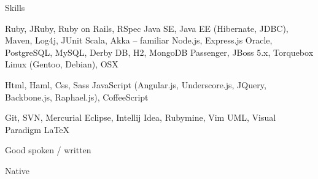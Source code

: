 \begin{rubric}{Skills}

\entry*
  Ruby, JRuby, Ruby on Rails, RSpec
\entry*
  Java SE, Java EE (Hibernate, JDBC), Maven, Log4j, JUnit
\entry*
  Scala, Akka – familiar
\entry*
  Node.js, Express.js
\entry*
  Oracle, PostgreSQL, MySQL, Derby DB, H2, MongoDB
\entry*
  Passenger, JBoss 5.x, Torquebox
\entry*
  Linux (Gentoo, Debian), OSX

\entry*
  Html, Haml, Css, Sass
\entry*
  JavaScript (Angular.js, Underscore.js, JQuery, Backbone.js, Raphael.js), CoffeeScript

\entry*
  Git, SVN, Mercurial
\entry*  
  Eclipse, Intellij Idea, Rubymine, Vim
\entry*
  UML, Visual Paradigm
\entry*
  LaTeX


\entry*[English:]
  Good spoken / written

\entry*[Polish:]
  Native

\end{rubric}
